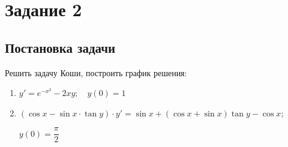 \documentclass[a4paper, 14pt, titlepage, fleqn]{extarticle}
\begin{document}
	\pagebreak
	\section*{Задание 2}
		\subsection*{Постановка задачи}
			\noindent Решить задачу Коши, построить график решения:
			\begin{enumerate}
				\item \(y' = e^{-x^2} - 2xy; \quad y(0) = 1\)
				\item \((\cos{x} - \sin{x} \cdot \tan{y}) \cdot y' = \sin{x} + (\cos{x} + \sin{x})\tan{y} - \cos{x};\) 

					\(y(0) = \dfrac{\pi}{2}\)
			\end{enumerate}
\end{document}
